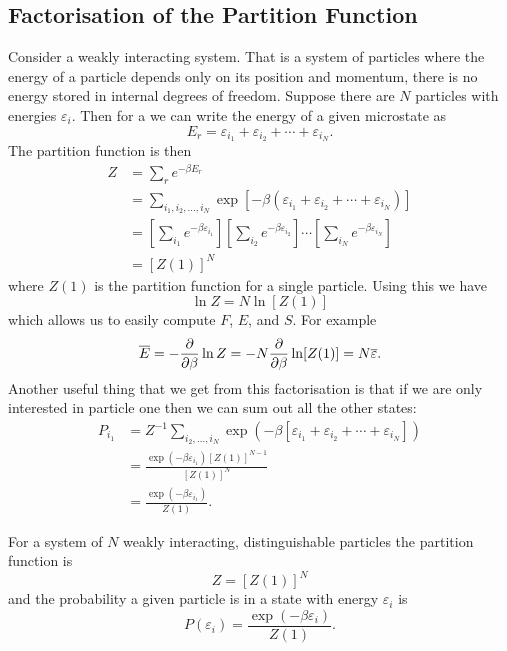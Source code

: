 \documentclass[a4paper]{article}
\newcommand{\mean}[1]{\overline{#1}}
\newcounter{keypointcounter}
\newenvironment{keypoint}{%
    \stepcounter{keypointcounter}
    \begin{tcolorbox}[breakable, title=Key Point \thekeypointcounter]
}{%
    \end{tcolorbox}
}
\begin{document}
    \subsection{Factorisation of the Partition Function}
    Consider a weakly interacting system.
    That is a system of particles where the energy of a particle depends only on its position and momentum, there is no energy stored in internal degrees of freedom.
    Suppose there are \(N\) particles with energies \(\varepsilon_i\).
    Then for a we can write the energy of a given microstate as
    \[E_r = \varepsilon_{i_1} + \varepsilon_{i_2} + \dotsb + \varepsilon_{i_N}.\]
    The partition function is then
    \begin{align*}
        Z &= \sum_r e^{-\beta E_r}\\
        &= \sum_{i_1, i_2, \dotsc, i_N} \exp[-\beta(\varepsilon_{i_1} + \varepsilon_{i_2} + \dotsb + \varepsilon_{i_N})]\\
        &= \left[\sum_{i_1}e^{-\beta\varepsilon_{i_1}}\right] \left[\sum_{i_2}e^{-\beta\varepsilon_{i_2}}\right] \dotsm \left[\sum_{i_N}e^{-\beta\varepsilon_{i_N}}\right]\\
        &= [Z(1)]^N
    \end{align*}
    where \(Z(1)\) is the partition function for a single particle.
    Using this we have
    \[\ln Z = N\ln[Z(1)]\]
    which allows us to easily compute \(F\), \(E\), and \(S\).
    For example
    \[\mean{E} = -\pdv{\beta}\ln Z = -N\pdv{\beta}\ln[Z(1)] = N\mean{\varepsilon}.\]
    Another useful thing that we get from this factorisation is that if we are only interested in particle one then we can sum out all the other states:
    \begin{align*}
        P_{i_1} &= Z^{-1}\sum_{i_2,\dotsc,i_N} \exp(-\beta [\varepsilon_{i_1} + \varepsilon_{i_2} + \dotsb + \varepsilon_{i_N}])\\
        &= \frac{\exp(-\beta\varepsilon_{i_1})[Z(1)]^{N-1}}{[Z(1)]^N}\\
        &= \frac{\exp(-\beta\varepsilon_{i_1})}{Z(1)}.
    \end{align*}
     \begin{keypoint}
        For a system of \(N\) weakly interacting, distinguishable particles the partition function is
        \[Z = [Z(1)]^N\]
        and the probability a given particle is in a state with energy \(\varepsilon_i\) is
        \[P(\varepsilon_i) = \frac{\exp(-\beta\varepsilon_i)}{Z(1)}.\]
    \end{keypoint}
    
\end{document}
